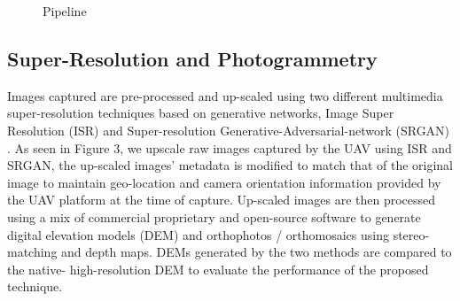 \documentclass[conference]{IEEEtran}
\begin{document}
\begin{figure}[htbp]
    \caption{Pipeline}
    \label{pipeline}
\end{figure}



\subsection{Super-Resolution and Photogrammetry}
Images captured are pre-processed and up-scaled using two
different multimedia super-resolution techniques based on
generative networks, Image Super Resolution (ISR) \cite{cardinale2018isr} and
Super-resolution Generative-Adversarial-network (SRGAN)
\cite{fastsrgan}. As seen in Figure 3, we upscale raw images captured
by the UAV using ISR and SRGAN, the up-scaled images'
metadata is modified to match that of the original image to
maintain geo-location and camera orientation information
provided by the UAV platform at the time of capture.
Up-scaled images are then processed using a mix of
commercial proprietary and open-source software to
generate digital elevation models (DEM) and orthophotos /
orthomosaics using stereo-matching and depth maps. DEMs
generated by the two methods are compared to the native-
high-resolution DEM to evaluate the performance of the
proposed technique.
\end{document}
